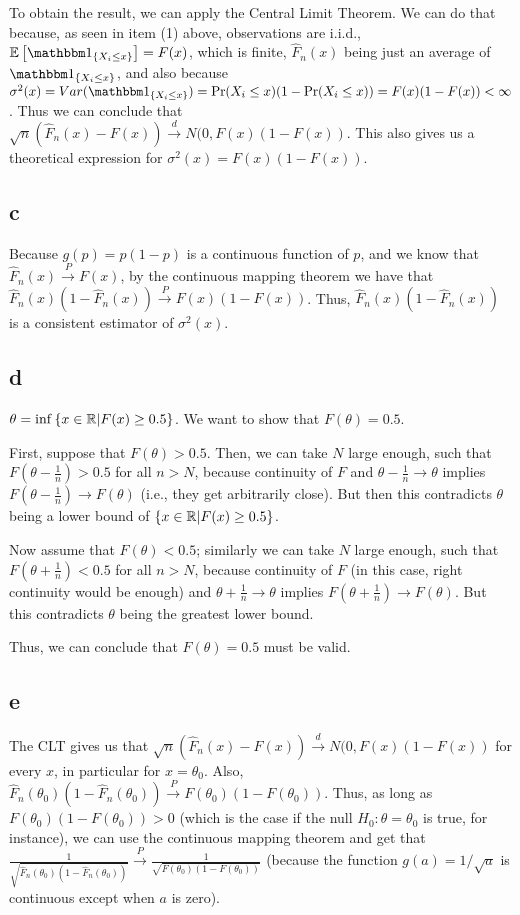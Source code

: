 \documentclass[12pt]{paper}
\begin{document}
To obtain the result, we can apply the Central Limit Theorem. We can do that because, as seen in item (1) above, observations are i.i.d., $\exV{\indicate{X_i\le x}}=F(x)$, which is finite, $\hat{F}_n(x)$ being just an average of $\indicate{X_i\le x}$, and also because $\sigma^2(x)=Var(\indicate{X_i\le x})=\Pr(X_i\le x)(1-\Pr(X_i\le x))=F(x)(1-F(x))<\infty$. Thus we can conclude that $\sqrt{n}(\hat{F}_n(x)-F(x))\overset{d}{\to}N(0,F(x)(1-F(x))$. This also gives us a theoretical expression for $\sigma^2(x)=F(x)(1-F(x))$.

\subsection*{c} 

Because $g(p)=p(1-p)$ is a continuous function of $p$, and we know that $\hat{F}_n(x)\overset{P}{\to}F(x)$, by the continuous mapping theorem we have that $\hat{F}_n(x)(1-\hat{F}_n(x))\overset{P}{\to}F(x)(1-F(x))$. Thus, $\hat{F}_n(x)(1-\hat{F}_n(x))$ is a consistent estimator of $\sigma^2(x)$.

\subsection*{d} 

$\theta=\inf{\{x\in \mathbb{R} |F(x)\ge 0.5\}}$. We want to show that $F(\theta)=0.5$.

First, suppose that $F(\theta)>0.5$. Then, we can take $N$ large enough, such that $F(\theta-\frac{1}{n})>0.5$ for all $n>N$, because continuity of $F$ and $\theta-\frac{1}{n}\to\theta$ implies $F(\theta-\frac{1}{n})\to F(\theta)$ (i.e., they get arbitrarily close). But then this contradicts $\theta$ being a lower bound of $\{x\in\mathbb{R}|F(x)\ge 0.5\}$. 

Now assume that $F(\theta)<0.5$; similarly we can take $N$ large enough, such that $F(\theta+\frac{1}{n})<0.5$ for all $n>N$, because continuity of $F$ (in this case, right continuity would be enough) and $\theta+\frac{1}{n}\to\theta$ implies $F(\theta+\frac{1}{n})\to F(\theta)$. But this contradicts $\theta$ being the greatest lower bound.

Thus, we can conclude that $F(\theta)=0.5$ must be valid.

\subsection*{e}

The CLT gives us that $\sqrt{n}(\hat{F}_n(x)-F(x))\overset{d}{\to}N(0,F(x)(1-F(x))$ for every $x$, in particular for $x=\theta_0$. Also, $\hat{F}_n(\theta_0)(1-\hat{F}_n(\theta_0))\overset{P}{\to}F(\theta_0)(1-F(\theta_0))$. Thus, as long as $F(\theta_0)(1-F(\theta_0))>0$ (which is the case if the null $H_0: \theta=\theta_0$ is true, for instance), we can use the continuous mapping theorem and get that $\frac{1}{\sqrt{\hat{F}_n(\theta_0)(1-\hat{F}_n(\theta_0))}}\overset{P}{\to}\frac{1}{\sqrt{F(\theta_0)(1-F(\theta_0))}}$ (because the function $g(a)=1/\sqrt{a}$ is continuous except when $a$ is zero).
\end{document}
